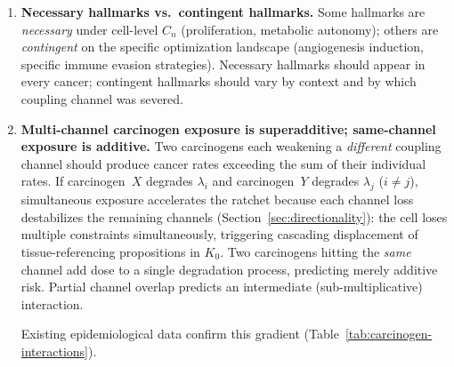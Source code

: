 \documentclass[11pt]{article}
\theoremstyle{definition}
\theoremstyle{remark}
\begin{document}
\begin{enumerate}
\item \textbf{Necessary hallmarks vs.\ contingent hallmarks.}
   Some hallmarks are \emph{necessary} under cell-level $C_n$
   (proliferation, metabolic autonomy); others are \emph{contingent}
   on the specific optimization landscape (angiogenesis induction,
   specific immune evasion strategies). Necessary hallmarks should
   appear in every cancer; contingent hallmarks should vary by
   context and by which coupling channel was severed.

\item \textbf{Multi-channel carcinogen exposure is superadditive;
   same-channel exposure is additive.}
   Two carcinogens each weakening a \emph{different} coupling channel
   should produce cancer rates exceeding the sum of their individual
   rates. If carcinogen~$X$ degrades $\lambda_i$ and carcinogen~$Y$
   degrades $\lambda_j$ ($i \neq j$), simultaneous exposure
   accelerates the ratchet because each channel loss destabilizes
   the remaining channels (Section~\ref{sec:directionality}): the
   cell loses multiple constraints simultaneously, triggering
   cascading displacement of tissue-referencing propositions in
   $K_0$. Two carcinogens hitting the \emph{same} channel add dose
   to a single degradation process, predicting merely additive risk.
   Partial channel overlap predicts an intermediate
   (sub-multiplicative) interaction.

   Existing epidemiological data confirm this gradient
   (Table~\ref{tab:carcinogen-interactions}).


\end{enumerate}
\end{document}
